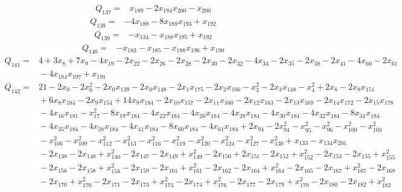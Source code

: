 \documentclass[11pt]{article}
\theoremstyle{definition}\newtheorem{definition}[theorem]{Definition}
\begin{document}
{\begin{align*}
 Q_{137}={}&x_{189} -2x_{194}x_{200} -x_{200}
\end{align*}
\begin{align*}
 Q_{138}={}&-4x_{189} -8x_{189}x_{193} +x_{192}
\end{align*}
\begin{align*}
 Q_{139}={}&-x_{134} -x_{188}x_{195} +x_{192}
\end{align*}
\begin{align*}
 Q_{140}={}&-x_{183} -x_{185} -x_{188}x_{196} +x_{190}
\end{align*}
\begin{align*}
 Q_{141}={}&4 +3x_{8} +7x_{9} -4x_{19} -2x_{22} -2x_{26} -2x_{28} -2x_{30} -2x_{32} -4x_{34} -2x_{35} -2x_{38} -2x_{41} -4x_{60} -2x_{61}\\
 &{}-4x_{184}x_{197} +x_{191}
\end{align*}
\begin{align*}
 Q_{142}={}&21 -2x_{0} -2x_{0}^{2} -2x_{0}x_{139} -2x_{0}x_{148} -2x_{1}x_{175} -2x_{2}x_{166} -x_{3}^{2} -2x_{3}x_{148} -x_{4}^{2} +2x_{8} -2x_{8}x_{151}\\
 &{}+6x_{8}x_{184} -2x_{9}x_{154} +14x_{9}x_{184} -2x_{10}x_{157} -2x_{11}x_{160} -2x_{12}x_{163} -2x_{13}x_{169} -2x_{14}x_{172} -2x_{15}x_{178}\\
 &{}-4x_{16}x_{181} -x_{17}^{2} -8x_{19}x_{184} -4x_{22}x_{184} -4x_{26}x_{184} -4x_{28}x_{184} -4x_{30}x_{184} -4x_{32}x_{184} -8x_{34}x_{184}\\
 &{}-4x_{35}x_{184} -4x_{38}x_{184} -4x_{41}x_{184} -8x_{60}x_{184} -4x_{61}x_{184} +2x_{94} -2x_{94}^{2} -x_{95}^{2} -x_{96}^{2} -x_{100}^{2} -x_{103}^{2}\\
 &{}-x_{106}^{2} -x_{109}^{2} -x_{112}^{2} -x_{113}^{2} -x_{116}^{2} -x_{119}^{2} -x_{120}^{2} -x_{124}^{2} -x_{127}^{2} -x_{130}^{2} +x_{133} -x_{134}x_{201}\\
 &{}-2x_{138} -2x_{140} +x_{140}^{2} -2x_{147} -2x_{149} +x_{149}^{2} -2x_{150} +2x_{151} -2x_{152} +x_{152}^{2} -2x_{153} -2x_{155} +x_{155}^{2}\\
 &{}-2x_{156} -2x_{158} +x_{158}^{2} -2x_{159} -2x_{161} +x_{161}^{2} -2x_{162} -2x_{164} +x_{164}^{2} -2x_{165} -2x_{167} +x_{167}^{2} -2x_{168}\\
 &{}-2x_{170} +x_{170}^{2} -2x_{171} -2x_{173} +x_{173}^{2} -2x_{174} +x_{176}^{2} -2x_{177} -2x_{179} +x_{179}^{2} -2x_{180} -2x_{182} +x_{182}^{2}\\

\end{align*}}
\end{document}
